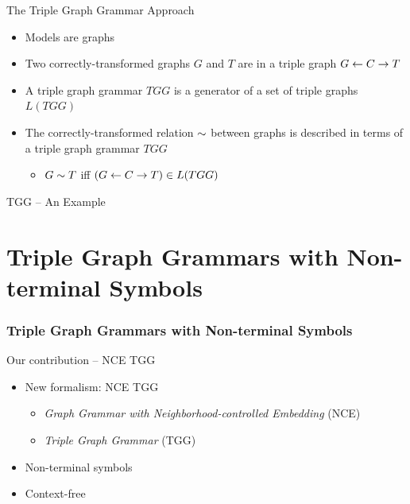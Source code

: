 \documentclass[usenames,dvipsnames]{beamer}
\begin{document}
	\begin{frame}{The Triple Graph Grammar Approach}
		\begin{itemize}
			\item Models are graphs
			\pause
			\item Two correctly-transformed graphs $G$ and $T$ are in a triple graph $G \overset{}{\leftarrow} C \overset{}{\rightarrow} T$\\
			
			\pause
			\item A triple graph grammar $TGG$ is a generator of a set of triple graphs $L(TGG)$
			\pause
			\item The correctly-transformed relation $\sim$ between graphs is described in terms of a triple graph grammar $TGG$
			\begin{itemize}
				\item $G \sim T $ iff $(G \overset{}{\leftarrow} C \overset{}{\rightarrow} T) \in L(TGG)$
			\end{itemize}
		\end{itemize}
	\end{frame}
	
	\begin{frame}{TGG -- An Example}
	\end{frame}
	
	\section{Triple Graph Grammars with Non-terminal Symbols}
	\begin{frame}
		\frametitle{Triple Graph Grammars with Non-terminal Symbols}
	\end{frame}
	
	\begin{frame}{Our contribution -- NCE TGG}
		\begin{itemize}
			\item New formalism: NCE TGG
			\begin{itemize}
				\item \emph{Graph Grammar with Neighborhood-controlled Embedding} (NCE) \cite{janssens1982graph}
				\item \emph{Triple Graph Grammar} (TGG) \cite{schurr1994specification}
			\end{itemize}
			\item Non-terminal symbols
			\item Context-free
		\end{itemize}
	\end{frame}
	
\end{document}
